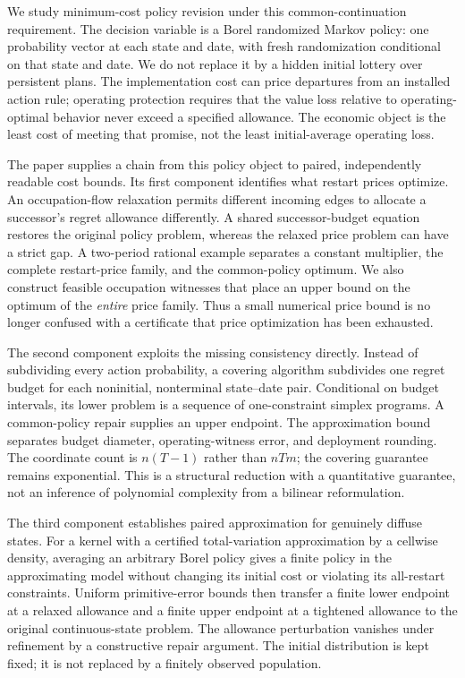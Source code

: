 We study minimum-cost policy revision under this common-continuation requirement. The decision variable is a Borel randomized Markov policy: one probability vector at each state and date, with fresh randomization conditional on that state and date. We do not replace it by a hidden initial lottery over persistent plans. The implementation cost can price departures from an installed action rule; operating protection requires that the value loss relative to operating-optimal behavior never exceed a specified allowance. The economic object is the least cost of meeting that promise, not the least initial-average operating loss.

The paper supplies a chain from this policy object to paired, independently readable cost bounds. Its first component identifies what restart prices optimize. An occupation-flow relaxation permits different incoming edges to allocate a successor's regret allowance differently. A shared successor-budget equation restores the original policy problem, whereas the relaxed price problem can have a strict gap. A two-period rational example separates a constant multiplier, the complete restart-price family, and the common-policy optimum. We also construct feasible occupation witnesses that place an upper bound on the optimum of the \emph{entire} price family. Thus a small numerical price bound is no longer confused with a certificate that price optimization has been exhausted.

The second component exploits the missing consistency directly. Instead of subdividing every action probability, a covering algorithm subdivides one regret budget for each noninitial, nonterminal state--date pair. Conditional on budget intervals, its lower problem is a sequence of one-constraint simplex programs. A common-policy repair supplies an upper endpoint. The approximation bound separates budget diameter, operating-witness error, and deployment rounding. The coordinate count is $n(T-1)$ rather than $nTm$; the covering guarantee remains exponential. This is a structural reduction with a quantitative guarantee, not an inference of polynomial complexity from a bilinear reformulation.

The third component establishes paired approximation for genuinely diffuse states. For a kernel with a certified total-variation approximation by a cellwise density, averaging an arbitrary Borel policy gives a finite policy in the approximating model without changing its initial cost or violating its all-restart constraints. Uniform primitive-error bounds then transfer a finite lower endpoint at a relaxed allowance and a finite upper endpoint at a tightened allowance to the original continuous-state problem. The allowance perturbation vanishes under refinement by a constructive repair argument. The initial distribution is kept fixed; it is not replaced by a finitely observed population.

